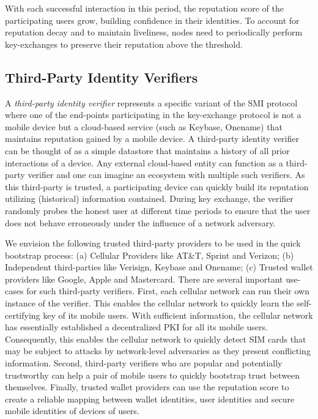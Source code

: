 \documentclass[letterpaper,twocolumn]{sig-alternate}
\begin{document}
\vspace{1mm}
With each successful interaction in this period, the reputation score of the participating users grow, building confidence in their identities. To account for reputation decay and to maintain liveliness, nodes need to periodically perform key-exchanges to preserve their reputation above the threshold.

\subsection{Third-Party Identity Verifiers}
\label{tpiv}

A {\em third-party identity verifier} represents a specific variant of the SMI protocol where one of the end-points participating in the key-exchange protocol is not a mobile device but a cloud-based service (such as Keybase, Onename) that maintains reputation gained by a mobile device. A third-party identity verifier can be thought of as a simple datastore that maintains a history of all prior interactions of a device. Any external cloud-based entity can function as a third-party verifier and one can imagine an ecosystem with multiple such verifiers. As this third-party is trusted, a participating device can quickly build its reputation utilizing (historical) information contained. During key exchange, the verifier randomly probes the honest user at different time periods to ensure that the user does not behave erroneously under the influence of a network adversary. 

We envision the following trusted third-party providers to be used in the quick bootstrap process: (a) Cellular Providers like AT\&T, Sprint and Verizon; (b) Independent third-parties like Verisign, Keybase and Onename; (c) Trusted wallet providers like Google, Apple and Mastercard. There are several important use-cases for such third-party verifiers. First, each cellular network can run their own instance of the verifier. This enables the cellular network
to quickly learn the self-certifying key of its mobile users. With sufficient information, the cellular network has essentially established a decentralized PKI for all its mobile users. Consequently, this enables the cellular network to quickly detect SIM cards that may be subject to attacks by network-level adversaries as they present conflicting information. Second, third-party verifiers who are popular and potentially trustworthy can help a pair of mobile users to quickly bootstrap trust between themselves. Finally, trusted wallet providers can use the reputation score to create a reliable mapping between wallet identities, user identities and secure mobile identities of devices of users. 
\end{document}
